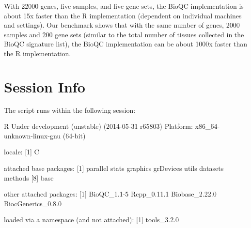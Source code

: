 \documentclass[11pt]{article}
\begin{document}
With 22000 genes, five samples, and five gene sets, the BioQC implementation is about 15x faster than the R implementation (dependent on individual machines and settings). Our benchmark shows that with the same number of genes, 2000 samples and 200 gene sets (similar to the total number of tissues collected in the BioQC signature list), the BioQC implementation can be about 1000x faster than the R implementation.

\section{Session Info}
The script runs within the following session:
\begin{Schunk}
\begin{Soutput}
R Under development (unstable) (2014-05-31 r65803)
Platform: x86_64-unknown-linux-gnu (64-bit)

locale:
[1] C

attached base packages:
[1] parallel  stats     graphics  grDevices utils     datasets  methods  
[8] base     

other attached packages:
[1] BioQC_1.1-5        Rcpp_0.11.1        Biobase_2.22.0     BiocGenerics_0.8.0

loaded via a namespace (and not attached):
[1] tools_3.2.0
\end{Soutput}
\end{Schunk}
\end{document}
